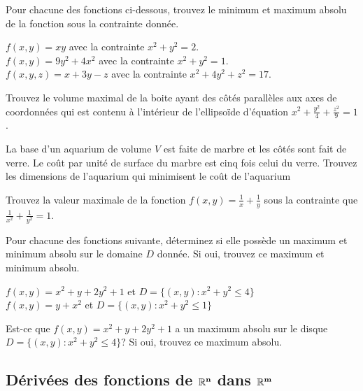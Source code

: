 \begin{question}[\eng]
Pour chacune des fonctions ci-dessous, trouvez le minimum et maximum
absolu de la fonction sous la contrainte donnée.

 $f(x,y) = xy$ avec la contrainte $x^2 + y^2 = 2$. \\
 $f(x,y) = 9y^2 + 4x^2$ avec la contrainte $x^2 + y^2 = 1$. \\
 $f(x,y,z) = x + 3 y - z$ avec la contrainte
$x^2 + 4 y^2 + z^2 = 17$.
\label{15Q23}
\end{question}

\begin{question}[\eng]
Trouvez le volume maximal de la boite ayant des côtés parallèles aux
axes de coordonnées qui est contenu à l'intérieur de l'ellipsoïde
d'équation $\displaystyle x^2 + \frac{y^2}{4} + \frac{z^2}{9} = 1$.
\label{15Q24}
\end{question}

\begin{question}[\eng]
La base d'un aquarium de volume $V$ est faite de marbre et les côtés
sont fait de verre.  Le coût par unité de surface du marbre est cinq
fois celui du verre.  Trouvez les dimensions de l'aquarium qui
minimisent le coût de l'aquarium
\label{15Q25}
\end{question}

\begin{question}[\eng]
Trouvez la valeur maximale de la fonction
$\displaystyle f(x,y) = \frac{1}{x} + \frac{1}{y}$ sous la contrainte
que $\displaystyle \frac{1}{x^2} + \frac{1}{y^2} = 1$.
\label{15Q26}
\end{question}

\begin{question}[\eng]
Pour chacune des fonctions suivante, déterminez si elle possède un
maximum et minimum absolu sur le domaine $D$ donnée.  Si oui, trouvez
ce maximum et minimum absolu.     

 $f(x,y) = x^2 + y + 2y^2 +1$ et  $D = \{(x,y) : x^2 + y^2 \leq 4\}$\\
 $f(x,y) = y+x^2$ et $D = \{(x,y) : x^2 + y^2 \leq 1\}$
\label{15Q27}
\end{question}

\begin{question}[\eng]
Est-ce que $f(x,y) = x^2 + y + 2y^2 +1$ a un maximum absolu sur le
disque $D = \{(x,y) : x^2 + y^2 \leq 4\}$?  Si oui, trouvez ce maximum
absolu.  
\label{15Q28}
\end{question}
\subsection{Dérivées des fonctions de $\mathbf{\mathbb{R}^n}$ dans
  $\mathbf{\mathbb{R}^m}$}

